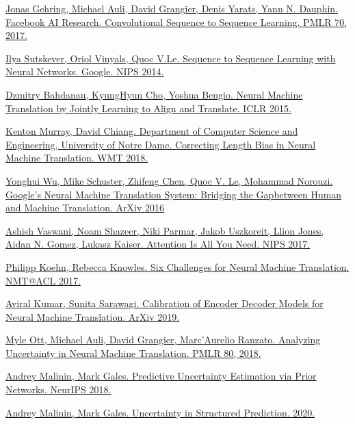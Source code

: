 \documentclass[a4paper,14pt]{extarticle}
\begin{document}
	\begin{thebibliography}{0}		
		\hypertarget{fconv}{}
		\href{https://arxiv.org/pdf/1705.03122.pdf}
		{Jonas Gehring, Michael Auli, David Grangier, Denis Yarats, Yann N. Dauphin. Facebook AI Research. Convolutional Sequence to Sequence Learning. PMLR 70, 2017.}
		
		\hypertarget{seq2seq}{}
		\href{https://papers.nips.cc/paper/5346-sequence-to-sequence-learning-with-neural-networks.pdf}
		{Ilya Sutskever, Oriol Vinyals, Quoc V.Le. Sequence to Sequence Learning with Neural Networks. Google. NIPS 2014.}
		
		\hypertarget{encdec_att}{}
		\href{https://arxiv.org/pdf/1409.0473.pdf}
		{Dzmitry Bahdanau, KyungHyun Cho, Yoshua Bengio. Neural Machine Translation by Jointly Learning to Align and Translate. ICLR 2015.}
		
		\hypertarget{corr_len_bias}{}
		\href{https://arxiv.org/pdf/1808.10006.pdf}
		{Kenton Murray, David Chiang. Department of Computer Science and Engineering, University of Notre Dame. Correcting Length Bias in Neural Machine Translation. WMT 2018.}
		
		\hypertarget{gnmt}{}
		\href{https://arxiv.org/pdf/1609.08144.pdf}
		{Yonghui Wu, Mike Schuster, Zhifeng Chen, Quoc V. Le, Mohammad Norouzi. Google’s Neural Machine Translation System: Bridging the Gapbetween Human and Machine Translation. ArXiv 2016}
		
		\hypertarget{transformer}{}
		\href{https://arxiv.org/pdf/1706.03762.pdf}
		{Ashish Vaswani, Noam Shazeer, Niki Parmar, Jakob Uszkoreit, Llion Jones, Aidan N. Gomez, Lukasz Kaiser. Attention Is All You Need. NIPS 2017.}
		
		\hypertarget{six_chall}{}
		\href{https://arxiv.org/pdf/1706.03872.pdf}
		{Philipp Koehn, Rebecca Knowles. Six Challenges for Neural Machine Translation. NMT@ACL 2017.}
		
		\hypertarget{calibration}{}
		\href{https://arxiv.org/pdf/1903.00802v1.pdf}
		{Aviral Kumar, Sunita Sarawagi. Calibration of Encoder Decoder Models for Neural Machine Translation. ArXiv 2019.}
		
		\hypertarget{anal_uncertainty}{}
		\href{https://arxiv.org/pdf/1803.00047.pdf}
		{Myle Ott, Michael Auli, David Grangier, Marc'Aurelio Ranzato. Analyzing Uncertainty in Neural Machine Translation. PMLR 80, 2018.}
		
		\hypertarget{prior}{}
		\href{https://papers.nips.cc/paper/7936-predictive-uncertainty-estimation-via-prior-networks.pdf}
		{Andrey Malinin, Mark Gales. Predictive Uncertainty Estimation via Prior Networks. NeurIPS 2018.}
		
		\hypertarget{uncertainty}{}
		\href{https://arxiv.org/pdf/2002.07650.pdf}
		{Andrey Malinin, Mark Gales. Uncertainty in Structured Prediction. 2020.}
	\end{thebibliography}
\end{document}
